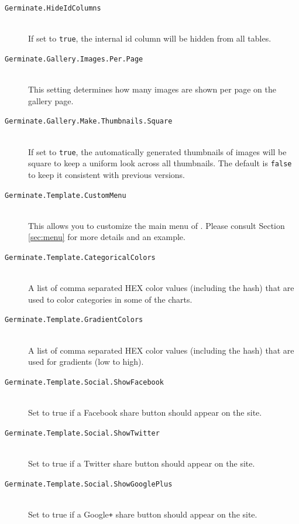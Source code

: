 \begin{description}
    \item[\texttt{Germinate.HideIdColumns}] \\
    If set to \texttt{true}, the internal id column will be hidden from all tables.
    \item[\texttt{Germinate.Gallery.Images.Per.Page}] \\This setting determines how many images are shown per page on the gallery page.
    \item[\texttt{Germinate.Gallery.Make.Thumbnails.Square}] \\If set to \texttt{true}, the automatically generated thumbnails of images will be square to keep a uniform look across all thumbnails. The default is \texttt{false} to keep it consistent with previous versions.
    \item[\texttt{Germinate.Template.CustomMenu}\nonoptionalif] \floatright{[XML]}\\This allows you to customize the main menu of {\germinate}. Please consult Section \ref{sec:menu} for more details and an example.
    \item[\texttt{Germinate.Template.CategoricalColors}\nonoptional] \\A list of comma separated HEX color values (including the hash) that are used to color categories in some of the charts.
    \item[\texttt{Germinate.Template.GradientColors}] \\A list of comma separated HEX color values (including the hash) that are used for gradients (low to high).
    \item[\texttt{Germinate.Template.Social.ShowFacebook}] \\Set to true if a Facebook share button should appear on the site.
    \item[\texttt{Germinate.Template.Social.ShowTwitter}] \\Set to true if a Twitter share button should appear on the site.
    \item[\texttt{Germinate.Template.Social.ShowGooglePlus}] \\Set to true if a Google\texttt{+} share button should appear on the site.

\end{description}
